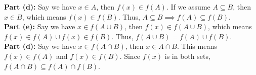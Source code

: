 \documentclass[11pt]{article}
\begin{document}
\begin{homeworkProblem}
    \textbf{Part (d):} Say we have $x \in A$, then $f(x) \in f(A)$. If we assume $A \subseteq B$, then $x \in B$, which means $f(x) \in f(B)$. Thus, $A \subseteq B \implies f(A) \subseteq f(B)$. \\

    \textbf{Part (e):} Say we have $x \in f(A \cup B)$, then $f(x) \in f(A \cup B)$, which means $f(x) \in f(A) \cup f(x) \in f(B)$. Thus, $f(A \cup B) = f(A) \cup f(B)$. \\

    \textbf{Part (d):} Say we have $x \in f(A \cap B)$, then $x \in A \cap B$. This means $f(x) \in f(A)$ and $f(x) \in f(B)$. Since $f(x)$ is in both sets, $f(A \cap B) \subseteq f(A) \cap f(B)$. \\

\end{homeworkProblem}

\pagebreak
\end{document}
